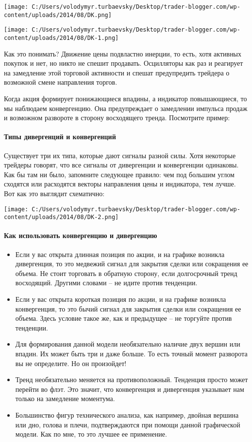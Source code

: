 \documentclass[a5paper]{article}
\begin{document}
\texttt{[image: C:/Users/volodymyr.turbaevsky/Desktop/trader-blogger.com/wp-content/uploads/2014/08/DK.png]}

\texttt{[image: C:/Users/volodymyr.turbaevsky/Desktop/trader-blogger.com/wp-content/uploads/2014/08/DK-1.png]}

Как это понимать? Движение цены подвластно инерции, то есть, хотя активных покупок и нет, но никто не спешит продавать. Осцилляторы как раз и реагирует на замедление этой торговой активности и спешат предупредить трейдера о возможной смене направления торгов.

Когда акция формирует понижающиеся впадины, а индикатор повышающиеся,
то мы наблюдаем конвергенцию. Она предупреждает о замедлении импульса
продаж и возможном развороте в сторону восходящего тренда. Посмотрите
пример:

\paragraph{Типы дивергенций и конвергенций}

Существует три их типа, которые дают сигналы разной силы. Хотя
некоторые трейдеры говорят, что все сигналы от дивергенции и
конвергенции одинаковы. Как бы там ни было, запомните следующее
правило: чем под большим углом сходятся или расходятся векторы
направления цены и индикатора, тем лучше. Вот как это выглядит
схематично:

\texttt{[image: C:/Users/volodymyr.turbaevsky/Desktop/trader-blogger.com/wp-content/uploads/2014/08/DK-2.png]}

\paragraph{Как использовать конвергенцию и дивергенцию}

\begin{itemize}

\item Если у вас открыта длинная позиция по акции, и на графике возникла дивергенция, то это медвежий сигнал для закрытия сделки или сокращения ее объема. Не стоит торговать в обратную сторону, если долгосрочный тренд восходящий. Другими словами – не идите против тенденции.
\item Если у вас открыта короткая позиция по акции, и на графике возникла конвергенция, то это бычий сигнал для закрытия сделки или сокращения ее объема. Здесь условие такое же, как и предыдущее – не торгуйте против тенденции.
\item Для формирования данной модели необязательно наличие двух вершин или впадин. Их может быть три и даже больше. То есть точный момент разворота вы не определите. Но он произойдет!
\item Тренд необязательно меняется на противоположный. Тенденция просто может перейти во флэт. Это значит, что конвергенция и дивергенция указывает нам только на замедление моментума.
\item Большинство фигур технического анализа, как например, двойная вершина или дно, голова и плечи, подтверждаются при помощи данной графической модели. Как по мне, то это лучшее ее применение.
\end{itemize}
\end{document}
